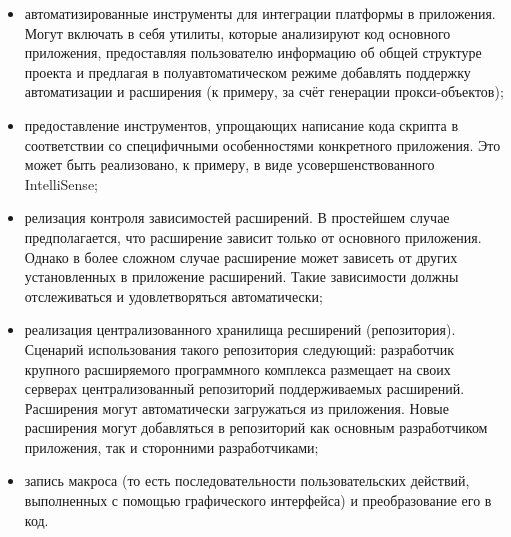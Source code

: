 \begin{itemize}
\item автоматизированные инструменты для интеграции платформы в приложения. Могут включать в себя утилиты, которые анализируют код основного приложения, предоставляя пользователю информацию об общей структуре проекта и предлагая в полуавтоматическом режиме добавлять поддержку автоматизации и расширения (к примеру, за счёт генерации прокси-объектов);
\item предоставление инструментов, упрощающих написание кода скрипта в соответствии со специфичными особенностями конкретного приложения. Это может быть реализовано, к примеру, в виде усовершенствованного IntelliSense;
\item релизация контроля зависимостей расширений. В простейшем случае предполагается, что расширение зависит только от основного приложения. Однако в более сложном случае расширение может зависеть от других установленных в приложение расширений. Такие зависимости должны отслеживаться и удовлетворяться автоматически;
\item реализация централизованного хранилища ресширений (репозитория). Сценарий использования такого репозитория следующий: разработчик крупного расширяемого программного комплекса размещает на своих серверах централизованный репозиторий поддерживаемых расширений. Расширения могут автоматически загружаться из приложения. Новые расширения могут добавляться в репозиторий как основным разработчиком приложения, так и сторонними разработчиками;
\item запись макроса (то есть последовательности пользовательских действий, выполненных с помощью графического интерфейса) и преобразование его в код.
\end{itemize}

\pagebreak
